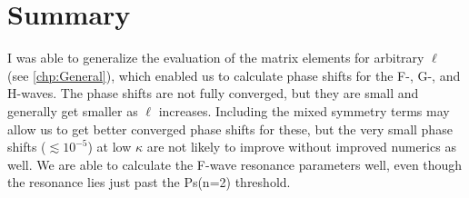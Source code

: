 \documentclass[Dissertation.tex]{subfiles}
\begin{document}


\section{Summary}
\label{sec:SummaryHigh}

I was able to generalize the evaluation of the matrix elements for arbitrary
$\ell$ (see \cref{chp:General}), which enabled us to calculate phase shifts
for the F-, G-, and H-waves. The phase shifts are not fully converged, but
they are small and generally get smaller as $\ell$ increases. Including the
mixed symmetry terms may allow us to get better converged phase shifts for
these, but the very small phase shifts ($\lesssim 10^{-5}$) at low $\kappa$ 
are not likely to improve without improved numerics as well. We are able to 
calculate the F-wave resonance parameters well, even though the resonance 
lies just past the Ps(n=2) threshold.



\biblio
\end{document}
